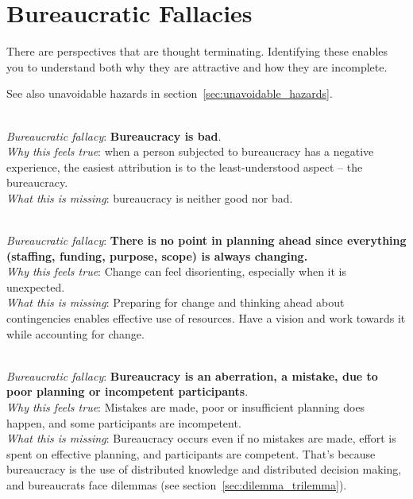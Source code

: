 \section{Bureaucratic Fallacies\label{sec:fallacies}}

There are perspectives that are \gls{thought terminating}. Identifying these enables you to understand both why they are attractive and how they are incomplete.

See also unavoidable hazards in section~\ref{sec:unavoidable_hazards}.

\ \\

\textit{Bureaucratic fallacy}: \textbf{Bureaucracy is bad}. \\
\textit{Why this feels true}: when a person subjected to bureaucracy has a negative experience, the easiest attribution is to the least-understood aspect -- the bureaucracy.\\
\textit{What this is missing}: \Gls{bureaucracy} is neither good nor bad. 

\ \\

\textit{Bureaucratic fallacy}: 
\textbf{There is no point in planning ahead since everything (staffing, funding, purpose, scope) is always changing.}\\
\textit{Why this feels true}: Change can feel disorienting, especially when it is unexpected. \\
\textit{What this is missing}: Preparing for change and thinking ahead about contingencies enables effective use of resources. Have a vision and work towards it while accounting for change. 


\ \\

\textit{Bureaucratic fallacy}: \textbf{Bureaucracy is an aberration, a mistake, due to poor planning or incompetent participants}. \\
\textit{Why this feels true}: Mistakes are made, poor or insufficient planning does happen, and some participants are incompetent.\\
\textit{What this is missing}: Bureaucracy occurs even if no mistakes are made, effort is spent on effective planning, and participants are competent. That's because bureaucracy is the use of distributed knowledge and distributed decision making, and bureaucrats face dilemmas (see section~\ref{sec:dilemma_trilemma}).

